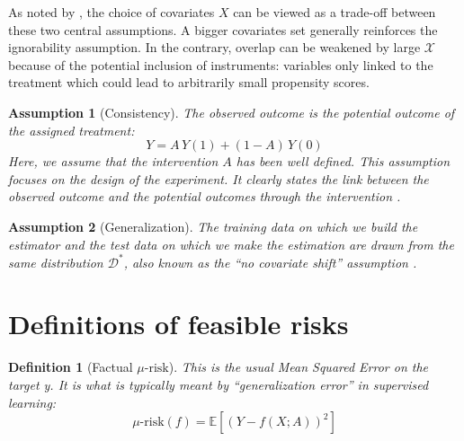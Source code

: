 \documentclass[10pt,twocolumn]{article}
\newtheorem{definition}{Definition}
\newtheorem{assumption}{Assumption}
\begin{document}
As noted by \cite{damour_overlap_2020}, the choice of covariates $X$ can
be viewed as a trade-off between these two central assumptions. A bigger
covariates set generally reinforces the ignorability assumption. In the
contrary, overlap can be weakened by large $\mathcal{X}$ because of the
potential inclusion of instruments: variables only linked to the treatment which
could lead to arbitrarily small propensity scores.


\begin{assumption}[Consistency]\label{assumption:consistency} The observed
    outcome is the potential outcome of the assigned treatment:
    \begin{equation*}\label{eq:consistancy}
        Y = A \, Y(1) + (1-A) \, Y(0)
    \end{equation*}
    Here, we assume that the intervention $A$ has been well defined. This
    assumption focuses on the design of the experiment. It clearly states the link
    between the observed outcome and the potential outcomes through the
    intervention \cite{hernan_causal_2020}.
\end{assumption}

\begin{assumption}[Generalization]\label{assumption:generalization} The training
    data on which we build the estimator and the test data on which we make the
    estimation are drawn from the same distribution $\mathcal D^*$, also known as
    the ``no covariate shift'' assumption \cite{jesson_identifying_2020}.
\end{assumption}

\section{Definitions of feasible risks}\label{def:feasible_risks}


\begin{definition}[Factual $\mu\text{-risk}$]\label{def:mu_risk}
    \cite{shalit_estimating_2017} This is the usual Mean Squared Error on
    the target y. It is what is typically meant by ``generalization error'' in
    supervised learning:
    \begin{equation*}\label{eq:mu_risk}
        \mu\text{-risk}(f)=\mathbb{E}\left[(Y-f(X ; A))^2 \right]
    \end{equation*}
\end{definition}
\end{document}
